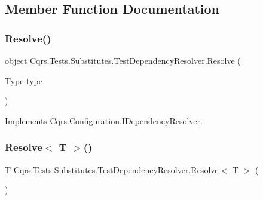 \subsection{Member Function Documentation}
\mbox{\label{classCqrs_1_1Tests_1_1Substitutes_1_1TestDependencyResolver_a05767824475ea6affbf6f70cf5b1fd06_a05767824475ea6affbf6f70cf5b1fd06}} 
\subsubsection{\texorpdfstring{Resolve()}{Resolve()}}
{\footnotesize\ttfamily object Cqrs.\+Tests.\+Substitutes.\+Test\+Dependency\+Resolver.\+Resolve (\begin{DoxyParamCaption}\item[{Type}]{type }\end{DoxyParamCaption})}



Implements \hyperlink{interfaceCqrs_1_1Configuration_1_1IDependencyResolver_aa455096b7b94fc1d64904bc67830ec06_aa455096b7b94fc1d64904bc67830ec06}{Cqrs.\+Configuration.\+I\+Dependency\+Resolver}.

\mbox{\label{classCqrs_1_1Tests_1_1Substitutes_1_1TestDependencyResolver_a67090a882241fa6a881d49c91c95cad7_a67090a882241fa6a881d49c91c95cad7}} 
\subsubsection{\texorpdfstring{Resolve$<$ T $>$()}{Resolve< T >()}}
{\footnotesize\ttfamily T \hyperlink{classCqrs_1_1Tests_1_1Substitutes_1_1TestDependencyResolver_a05767824475ea6affbf6f70cf5b1fd06_a05767824475ea6affbf6f70cf5b1fd06}{Cqrs.\+Tests.\+Substitutes.\+Test\+Dependency\+Resolver.\+Resolve}$<$ T $>$ (\begin{DoxyParamCaption}{ }\end{DoxyParamCaption})}



